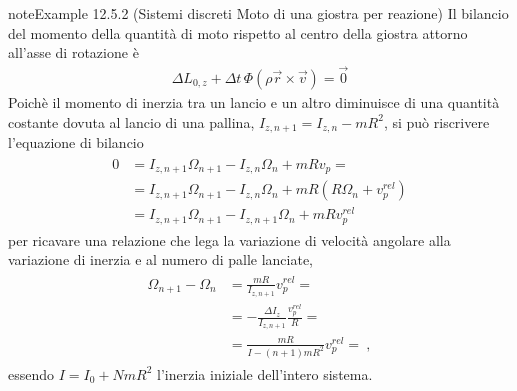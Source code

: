 \documentclass[letterpaper,10pt,italian]{jupyterBook}
\begin{document}
\begin{sphinxadmonition}{note}{Example 12.5.2 (Sistemi discreti \sphinxhyphen{} Moto di una giostra per reazione)}
\sphinxAtStartPar
Il bilancio del momento della quantità di moto rispetto al centro della giostra attorno all’asse di rotazione è
\begin{equation*}
\begin{split}\Delta L_{0,z} + \Delta t \, \Phi(\rho \vec{r} \times \vec{v}) = \vec{0}\end{split}
\end{equation*}
\sphinxAtStartPar
Poichè il momento di inerzia tra un lancio e un altro diminuisce di una quantità costante dovuta al lancio di una pallina,  \(I_{z,n+1} = I_{z,n} - m R^2\), si può riscrivere l’equazione di bilancio
\begin{equation*}
\begin{split}\begin{aligned}
  0 & = I_{z,n+1} \Omega_{n+1} - I_{z,n} \Omega_n + m R v_p =  \\
    & = I_{z,n+1} \Omega_{n+1} - I_{z,n} \Omega_n + m R ( R \Omega_n + v_p^{rel} ) \\
    & = I_{z,n+1} \Omega_{n+1} - I_{z,n+1} \Omega_n + m R v_p^{rel}
\end{aligned}\end{split}
\end{equation*}
\sphinxAtStartPar
per ricavare una relazione che lega la variazione di velocità angolare alla variazione di inerzia e al numero di palle lanciate,
\begin{equation*}
\begin{split}\begin{aligned}
  \Omega_{n+1} - \Omega_n & =  \frac{m R}{I_{z,n+1}} v_p^{rel} = \\
                          & = - \frac{\Delta I_{z}}{I_{z,n+1}} \frac{v_p^{rel}}{R} = \\
                          & =  \frac{m R}{I - (n+1) mR^2} v_p^{rel} = \ ,
\end{aligned}\end{split}
\end{equation*}
\sphinxAtStartPar
essendo \(I = I_0 + N m R^2\) l’inerzia iniziale dell’intero sistema.
\end{sphinxadmonition}
\label{ch/mechanics/dynamics-eom-open:mechanics:dynamics:open:ex:rockets}
\end{document}
